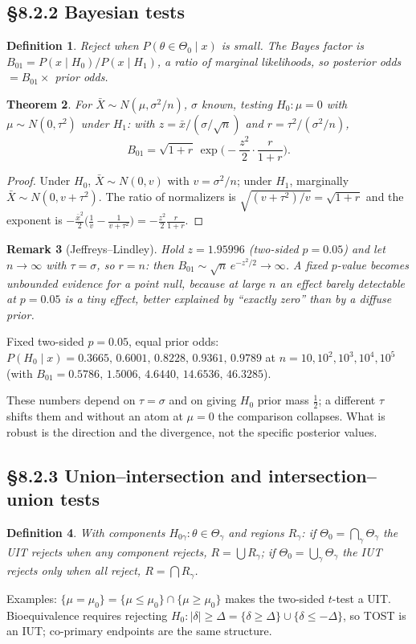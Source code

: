 \documentclass[11pt]{article}
\newtheorem{theorem}{Theorem}[section]
\newtheorem{definition}[theorem]{Definition}
\newtheorem{remark}[theorem]{Remark}
\begin{document}
\subsection{\S8.2.2 Bayesian tests}
\begin{definition}
Reject when $P(\theta\in\Theta_0\mid x)$ is small. The Bayes factor is $B_{01}=P(x\mid H_0)/P(x\mid H_1)$, a ratio of marginal likelihoods, so posterior odds $=B_{01}\times$ prior odds.
\end{definition}
\begin{theorem}
For $\bar X\sim N(\mu,\sigma^2/n)$, $\sigma$ known, testing $H_0:\mu=0$ with $\mu\sim N(0,\tau^2)$ under $H_1$: with $z=\bar x/(\sigma/\sqrt n)$ and $r=\tau^2/(\sigma^2/n)$,
\[B_{01}=\sqrt{1+r}\,\exp\Big(-\frac{z^2}{2}\cdot\frac{r}{1+r}\Big).\]
\end{theorem}
\begin{proof}
Under $H_0$, $\bar X\sim N(0,v)$ with $v=\sigma^2/n$; under $H_1$, marginally $\bar X\sim N(0,v+\tau^2)$. The ratio of normalizers is $\sqrt{(v+\tau^2)/v}=\sqrt{1+r}$ and the exponent is $-\frac{\bar x^2}2\big(\frac1v-\frac1{v+\tau^2}\big)=-\frac{z^2}2\frac r{1+r}$.
\end{proof}
\begin{remark}[Jeffreys--Lindley]
Hold $z=1.95996$ (two-sided $p=0.05$) and let $n\to\infty$ with $\tau=\sigma$, so $r=n$: then $B_{01}\sim\sqrt n\,e^{-z^2/2}\to\infty$. A fixed $p$-value becomes unbounded evidence \emph{for} a point null, because at large $n$ an effect barely detectable at $p=0.05$ is a tiny effect, better explained by ``exactly zero'' than by a diffuse prior.
\end{remark}
\begin{simbox}
Fixed two-sided $p=0.05$, equal prior odds: $P(H_0\mid x)=0.3665,\,0.6001,\,0.8228,\,0.9361,\,0.9789$ at $n=10,10^2,10^3,10^4,10^5$ (with $B_{01}=0.5786,\,1.5006,\,4.6440,\,14.6536,\,46.3285$).
\end{simbox}
\begin{flagbox}
These numbers depend on $\tau=\sigma$ and on giving $H_0$ prior mass $\frac12$; a different $\tau$ shifts them and without an atom at $\mu=0$ the comparison collapses. What is robust is the direction and the divergence, not the specific posterior values.
\end{flagbox}

\subsection{\S8.2.3 Union--intersection and intersection--union tests}
\begin{definition}
With components $H_{0\gamma}:\theta\in\Theta_\gamma$ and regions $R_\gamma$: if $\Theta_0=\bigcap_\gamma\Theta_\gamma$ the \emph{UIT} rejects when any component rejects, $R=\bigcup R_\gamma$; if $\Theta_0=\bigcup_\gamma\Theta_\gamma$ the \emph{IUT} rejects only when all reject, $R=\bigcap R_\gamma$.
\end{definition}
Examples: $\{\mu=\mu_0\}=\{\mu\le\mu_0\}\cap\{\mu\ge\mu_0\}$ makes the two-sided $t$-test a UIT. Bioequivalence requires rejecting $H_0:|\delta|\ge\Delta=\{\delta\ge\Delta\}\cup\{\delta\le-\Delta\}$, so TOST is an IUT; co-primary endpoints are the same structure.
\end{document}
